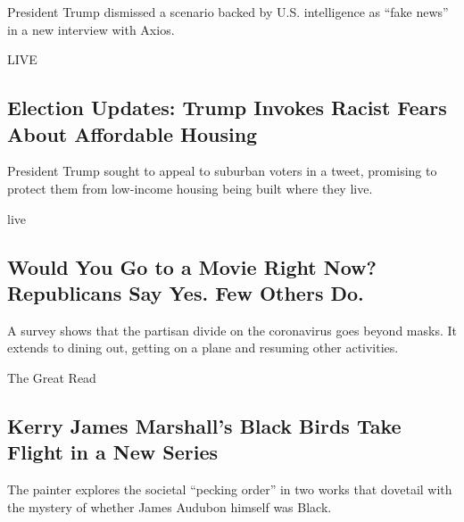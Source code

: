 President Trump dismissed a scenario backed by U.S. intelligence as
``fake news'' in a new interview with Axios.

\href{/2020/07/29/us/elections/biden-vs-trump.html}{}

LIVE

\hypertarget{election-updates-trump-invokes-racist-fears-about-affordable-housing}{%
\subsection{Election Updates: Trump Invokes Racist Fears About
Affordable
Housing}\label{election-updates-trump-invokes-racist-fears-about-affordable-housing}}

President Trump sought to appeal to suburban voters in a tweet,
promising to protect them from low-income housing being built where they
live.

live

\href{/2020/07/24/business/economy/republicans-democrats-coronavirus-survey.html}{}

\hypertarget{would-you-go-to-a-movie-right-now-republicans-say-yes-few-others-do}{%
\subsection{Would You Go to a Movie Right Now? Republicans Say Yes. Few
Others
Do.}\label{would-you-go-to-a-movie-right-now-republicans-say-yes-few-others-do}}

A survey shows that the partisan divide on the coronavirus goes beyond
masks. It extends to dining out, getting on a plane and resuming other
activities.

\href{/2020/07/29/arts/design/kerry-james-marshall-audubon.html}{}

The Great Read

\hypertarget{kerry-james-marshalls-black-birds-take-flight-in-a-new-series}{%
\subsection{Kerry James Marshall's Black Birds Take Flight in a New
Series}\label{kerry-james-marshalls-black-birds-take-flight-in-a-new-series}}

The painter explores the societal ``pecking order'' in two works that
dovetail with the mystery of whether James Audubon himself was Black.

\href{/2020/07/29/arts/design/kerry-james-marshall-audubon.html}{}

